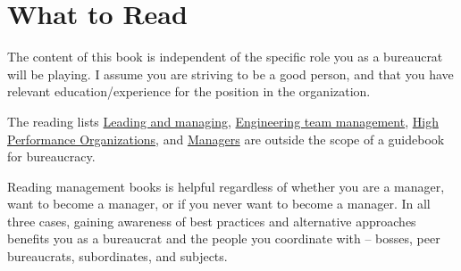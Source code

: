 \section{What to Read\label{sec:to-read}}

The content of this book is independent of the specific role you as a bureaucrat will be playing. I assume you are striving to be a good person, and that you have relevant education/experience for the position in the organization.

The reading lists 
\href{https://github.com/LappleApple/awesome-leading-and-managing}{Leading and managing}, 
\href{https://github.com/kdeldycke/awesome-engineering-team-management}{Engineering team management}, 
\href{https://github.com/pdfernhout/High-Performance-Organizations-Reading-List}{High Performance Organizations}, and 
\href{https://github.com/ankitjaininfo/awesome-managers}{Managers}
are outside the scope of a guidebook for bureaucracy. 


Reading management books is helpful regardless of whether you are a manager, want to become a manager, or if you never want to become a manager. In all three cases, gaining awareness of best practices and alternative approaches benefits you as a bureaucrat and the people you coordinate with -- bosses, peer bureaucrats, subordinates, and subjects.
